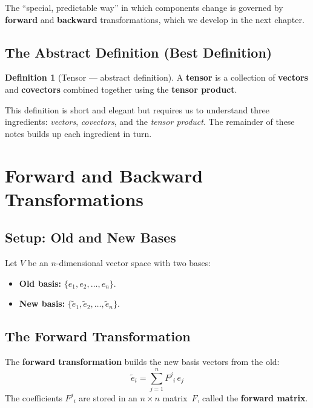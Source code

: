 \documentclass[12pt, a4paper]{report}
\theoremstyle{definition}
\newtheorem{definition}{Definition}[chapter]
\theoremstyle{plain}
\theoremstyle{remark}
\newcommand{\tildee}[1]{\tilde{e}_{#1}}
\begin{document}
The ``special, predictable way'' in which components change is governed by
\textbf{forward} and \textbf{backward} transformations, which we develop in the next
chapter.

\section{The Abstract Definition (Best Definition)}\label{sec:abstract-def}

\begin{definition}[Tensor --- abstract definition]
A \textbf{tensor} is a collection of \textbf{vectors} and \textbf{covectors}
combined together using the \textbf{tensor product}.
\end{definition}

This definition is short and elegant but requires us to understand three ingredients:
\emph{vectors}, \emph{covectors}, and the \emph{tensor product}.  The remainder of
these notes builds up each ingredient in turn.

\chapter{Forward and Backward Transformations}\label{ch:fwd-bwd}

\section{Setup: Old and New Bases}

Let $V$ be an $n$-dimensional vector space with two bases:
\begin{itemize}[nosep]
    \item \textbf{Old basis:} $\{e_1, e_2, \dots, e_n\}$.
    \item \textbf{New basis:} $\{\tildee{1}, \tildee{2}, \dots, \tildee{n}\}$.
\end{itemize}

\section{The Forward Transformation}

The \textbf{forward transformation} builds the new basis vectors from the old:
\begin{equation}\label{eq:fwd}
    \boxed{\tildee{i} = \sum_{j=1}^{n} F^{j}{}_{i}\, e_j}
\end{equation}
The coefficients $F^{j}{}_{i}$ are stored in an $n\times n$ matrix~$F$, called the
\textbf{forward matrix}.
\end{document}
